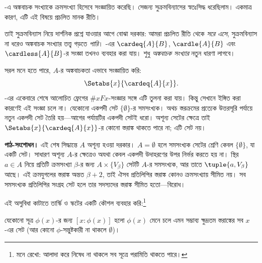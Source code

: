 \documentclass[../../../include/open-logic-section]{subfiles}
\begin{document}

-এ
অঙ্কবাচক সংখ্যাকে ক্রমসংখ্যা হিসেবে সংজ্ঞায়িত করেছি।
সেজন্য সুক্রমবিন্যাসের স্বতঃসিদ্ধ ধরেছিলাম। একমাত্র
কারণ, এটি এই বিষয়ে প্রচলিত মানক রীতি।

তাই সুক্রমবিন্যাস নিয়ে দার্শনিক প্রশ্নে যাওয়ার আগে
বোঝা দরকার: আমরা প্রচলিত রীতি থেকে \emph{সরে এসে},
সুক্রমবিন্যাস না ধরেও অঙ্কবাচক সংখ্যার তত্ত্ব গড়তে
\emph{পারি}। -এর
$\cardeq{A}{B}$, $\cardle{A}{B}$ এবং
$\cardless{A}{B}$-র সংজ্ঞা তখনও ব্যবহার করা যায়।
শুধু \emph{অঙ্কবাচক সংখ্যার} নতুন ধারণা লাগবে।

সরল মনে হতে পারে, $A$-র অঙ্কবাচকতা এভাবে সংজ্ঞায়িত করি:
\[
	\Setabs{x}{\cardeq{A}{x}}.
\]
-এর একেবারে শেষে আলোচিত
ফ্রেগের $\# x Fx$-সংজ্ঞার সঙ্গে এটি তুলনা করা যায়।
কিন্তু সেখানে ইঙ্গিত করা কারণেই এই সংজ্ঞা চলে না।
যেকোনো একপদী সেট $\{\emptyset\}$-র সমসংখ্যক।
অথচ স্তরক্রমের প্রত্যেক উত্তরসূরি পর্যায়ে নতুন একপদী
সেট তৈরি হয়—আগের পর্যায়টির একপদী সেটই ধরো।
অশূন্য সেটের ক্ষেত্রে তাই $\Setabs{x}{\cardeq{A}{x}}$-র কোনো স্তরাঙ্ক
থাকতে পারে না; এটি সেট নয়।
\par\noindent\textbf{পাঠ-সংশোধন।} এই শেষ সিদ্ধান্তে $A$ অশূন্য হওয়া দরকার। $A=\emptyset$
হলে সমসংখ্যক সেটের শ্রেণি কেবল $\{\emptyset\}$, যা একটি সেট।
সাধারণ অশূন্য $A$-র ক্ষেত্রেও অযথা কেবল একপদী উদাহরণের
উপর নির্ভর করতে হয় না। স্থির $a\in A$ নিয়ে প্রতিটি
ক্রমসংখ্যা $\beta$-র জন্য $A\times\{V_\beta\}$ সেটটি
$A$-র সমসংখ্যক, আর তাতে $\tuple{a,V_\beta}$ আছে। এই
ক্রমযুগলের স্তরাঙ্ক অন্তত $\beta+2$, তাই ঐসব প্রতিলিপির স্তরাঙ্ক
কোনও ক্রমসংখ্যায় সীমিত নয়। সব সমসংখ্যক প্রতিলিপির সংগ্রহ
সেট হলে তার সদস্যদের স্তরাঙ্ক সীমিত হতো—বিরোধ।

এই অসুবিধা কাটাতে তার্স্কি ও স্কটের একটি কৌশল
ব্যবহার করি:\footnote{মনে রেখো: আলাদা করে নিষেধ
না থাকলে সব সূত্রে পরামিতি থাকতে পারে।}

\begin{defn}[তার্স্কি--স্কট]
যেকোনো সূত্র $\phi(x)$-র জন্য $[ x : \phi(x)] $
হলো $\phi(x)$ মেনে চলে এমন সম্ভাব্য ক্ষুদ্রতম স্তরাঙ্কের
সব $x$-এর সেট (আর কোনো $\phi$-সন্তুষ্টকারী না থাকলে
$\emptyset$)।
\end{defn}
\end{document}
